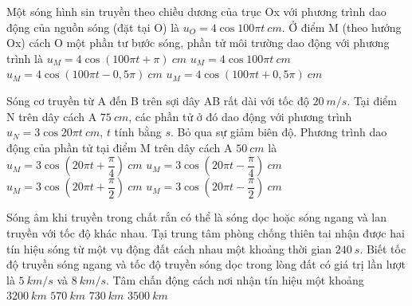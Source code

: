 	
	\begin{ex}%
		Một sóng hình sin truyền theo chiều dương của trục Ox với phương trình dao động của nguồn sóng (đặt tại O) là $u_O = 4\cos100\pi t\ cm$. Ở điểm M (theo hướng Ox) cách O một phần tư bước sóng, phần tử môi trường dao động với phương trình là
		\choice
		{$u_M = 4\cos(100\pi t + \pi)\ cm$}
		{$u_M = 4\cos100\pi t\ cm$}
		{\True $u_M = 4\cos(100\pi t - 0,5\pi)\ cm$}
		{$u_M = 4\cos(100\pi t + 0,5\pi)\ cm$}
	\end{ex}
	\begin{ex}%
		Sóng cơ truyền từ A đến B trên sợi dây AB rất dài với tốc độ $20\ m/s$. Tại điểm N trên dây cách A $75\ cm$, các phần tử ở đó dao động với phương trình $u_N = 3\cos20\pi t\ cm$, $t$ tính bằng $s$. Bỏ qua sự giảm biên độ. Phương trình dao động của phần tử tại điểm M trên dây cách A $50\ cm$ là
		\choice
		{\True $u_M = 3\cos(20\pi t + \dfrac{\pi}{4})\ cm$}
		{$u_M = 3\cos(20\pi t - \dfrac{\pi}{4})\ cm$}
		{$u_M = 3\cos(20\pi t + \dfrac{\pi}{2})\ cm$}
		{$u_M = 3\cos(20\pi t - \dfrac{\pi}{2})\ cm$}
	\end{ex}
	\begin{ex}%
		Sóng âm khi truyền trong chất rắn có thể là sóng dọc hoặc sóng ngang và lan truyền với tốc độ khác nhau. Tại trung tâm phòng chống thiên tai nhận được hai tín hiệu sóng từ một vụ động đất cách nhau một khoảng thời gian $240\ s$. Biết tốc độ truyền sóng ngang và tốc độ truyền sóng dọc trong lòng đất có giá trị lần lượt là $5\ km/s$ và $8\ km/s$. Tâm chấn động cách nơi nhận tín hiệu một khoảng 
		\choice
		{\True $3200\ km$}
		{$570\ km$}
		{$730\ km$}
		{$3500\ km$}
	\end{ex}
